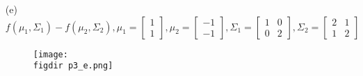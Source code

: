 \documentclass[11pt]{article}
\theoremstyle{quest}
\newcommand{\figdir}{../figures/}
\begin{document}
\begin{itemize}
\item[(e)]
$f(\mu_1, \Sigma_1) - f(\mu_2, \Sigma_2), \mu_1 = \begin{bmatrix}1 \\ 1\end{bmatrix}, \mu_2 = \begin{bmatrix}-1 \\ -1\end{bmatrix}, \Sigma_1 = \begin{bmatrix}1 & 0 \\ 0 & 2\end{bmatrix}, \Sigma_2 = \begin{bmatrix}2 & 1 \\ 1 & 2\end{bmatrix}$
\begin{figure}[H]
\centering
\texttt{[image: \\figdir p3\_e.png]}
\end{figure}
\end{itemize}
\newpage
\end{document}
